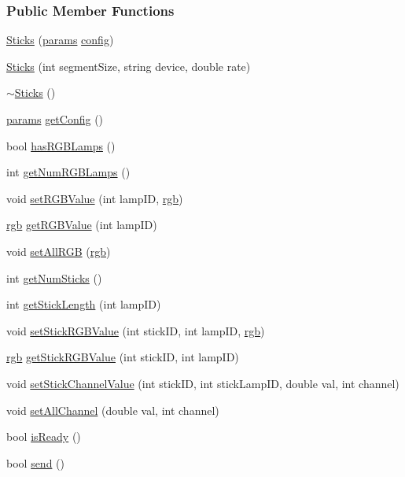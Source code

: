 \subsubsection*{\-Public \-Member \-Functions}
\begin{DoxyCompactItemize}
\item 
\hyperlink{classSticks_ac82542df85c5dbfd68c84687af6591fd}{\-Sticks} (\hyperlink{structSticks_1_1params}{params} \hyperlink{classSticks_ad77454176517e28c47a4eba37c307d02}{config})
\item 
\hyperlink{classSticks_ac2c945078a4add60443f7ad3caaa377d}{\-Sticks} (int segment\-Size, string device, double rate)
\item 
\hyperlink{classSticks_ac62f6318efd98f6f636ed9bafb51db21}{$\sim$\-Sticks} ()
\item 
\hyperlink{structSticks_1_1params}{params} \hyperlink{classSticks_a54a8ba2fb5eacdc1b529bd92efbe4475}{get\-Config} ()
\item 
bool \hyperlink{classSticks_a7baa38ffec8cecc9ffebf99010db1e92}{has\-R\-G\-B\-Lamps} ()
\item 
int \hyperlink{classSticks_a2c87f49e1415691e50c84f7f071f07a9}{get\-Num\-R\-G\-B\-Lamps} ()
\item 
void \hyperlink{classSticks_a6500a23f49137753c03d61ca6ecbc727}{set\-R\-G\-B\-Value} (int lamp\-I\-D, \hyperlink{structrgb}{rgb})
\item 
\hyperlink{structrgb}{rgb} \hyperlink{classSticks_a12d3d039d913d36180bfe7820115f731}{get\-R\-G\-B\-Value} (int lamp\-I\-D)
\item 
void \hyperlink{classSticks_aaf3b58bc647d0d6c31825e64b4398281}{set\-All\-R\-G\-B} (\hyperlink{structrgb}{rgb})
\item 
int \hyperlink{classSticks_af6af53b803183ff0c81b119e9726fac0}{get\-Num\-Sticks} ()
\item 
int \hyperlink{classSticks_ad50d1570ca4a0837b448381bc738d422}{get\-Stick\-Length} (int lamp\-I\-D)
\item 
void \hyperlink{classSticks_a84810306863a52b6ad8fdb790bec1103}{set\-Stick\-R\-G\-B\-Value} (int stick\-I\-D, int lamp\-I\-D, \hyperlink{structrgb}{rgb})
\item 
\hyperlink{structrgb}{rgb} \hyperlink{classSticks_a9900abe23c463b65a8ef05dc9f63c035}{get\-Stick\-R\-G\-B\-Value} (int stick\-I\-D, int lamp\-I\-D)
\item 
void \hyperlink{classSticks_aa3027db7aa82003ed782961f26844f22}{set\-Stick\-Channel\-Value} (int stick\-I\-D, int stick\-Lamp\-I\-D, double val, int channel)
\item 
void \hyperlink{classSticks_ad2740b596bbeb3c24da66272ae290372}{set\-All\-Channel} (double val, int channel)
\item 
bool \hyperlink{classSticks_a6fc1fb933fbe6ce05ba88ef83322a0f1}{is\-Ready} ()
\item 
bool \hyperlink{classSticks_aa19dfda62c22c44cd4bda1e3abe3f0af}{send} ()
\end{DoxyCompactItemize}
